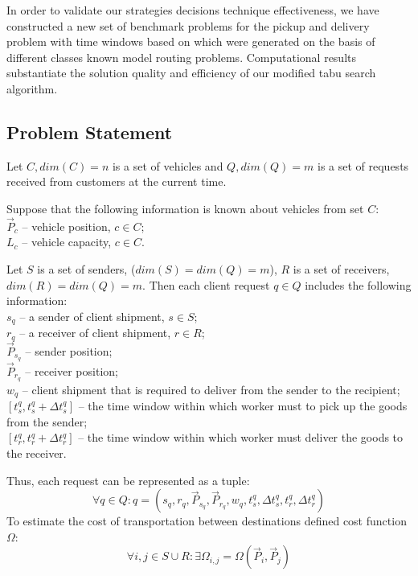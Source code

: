 \documentclass[]{TAACpaper}
\begin{document}
In order to validate our strategies decisions technique effectiveness, we have constructed a new set of benchmark problems for the pickup and delivery problem with time windows based on which were generated on the basis of different classes known model routing problems. Computational results substantiate the solution quality and efficiency of our modified tabu search algorithm.
 

\subsection{Problem Statement}
Let $C,dim(C)=n$ is a set of vehicles and $Q,dim(Q)=m$ is a set of requests received from customers at the current time.

Suppose that the following information is known about vehicles from set $C$: \\
$\vec{P}_c$ -- vehicle position, $c \in C$;\\
$L_c$ -- vehicle capacity, $c \in C$.

Let $S$ is a set of senders, ($dim(S) = dim(Q) = m$), $R$ is a set of receivers, $dim(R) = dim(Q) = m$. Then each client request $q \in Q$ includes the following information:\\
$s_q$ -- a sender of client shipment, $s \in S$; \\
$r_q$ -- a receiver of client shipment, $r \in R$; \\
$\vec{P}_{s_q}$ -- sender position;\\
$\vec{P}_{r_q}$ -- receiver position; \\
$w_q$ -- client shipment that is required to deliver from the sender to the recipient; \\
$[t_{s}^{q}, t_{s}^{q}+ \Delta{t_{s}^{q}}]$ -- the time window within which worker must to pick up the goods from the sender;\\ 
$[t_{r}^{q}, t_{r}^{q}+ \Delta{t_{r}^{q}}]$ -- the time window within which worker must deliver the goods to the receiver.
 
Thus, each request can be represented as a tuple:
\begin{equation}
\forall q \in Q: q = (s_q,r_q, \vec{P}_{s_q}, \vec{P}_{r_q}, w_q, t_{s}^{q}, \Delta{t_{s}^{q}}, t_{r}^{q}, \Delta{t_{r}^{q}})
\end{equation}
To estimate the cost of transportation between destinations defined cost function $\Omega$:
\begin{equation}
\forall i,j \in S \cup R: \exists \Omega_{i,j} = \Omega(\vec{P}_i,\vec{P}_j)
\end{equation}
\end{document}

